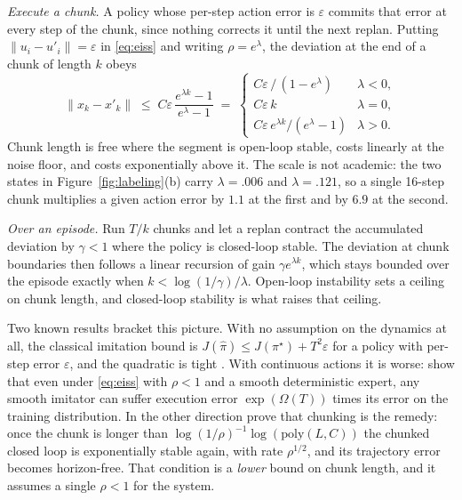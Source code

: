 \emph{Execute a chunk.} A policy whose per-step action error is $\varepsilon$
commits that error at every step of the chunk, since nothing corrects it until
the next replan. Putting $\lVert u_i - u'_i \rVert = \varepsilon$ in
\eqref{eq:eiss} and writing $\rho = e^{\lambda}$, the deviation at the end of a
chunk of length $k$ obeys
\begin{equation}
\lVert x_k - x'_k \rVert \;\le\; C\varepsilon\,
\frac{e^{\lambda k}-1}{e^{\lambda}-1}
\;=\;
\begin{cases}
C\varepsilon\,/\,(1-e^{\lambda}) & \lambda < 0,\\[2pt]
C\varepsilon\,k & \lambda = 0,\\[2pt]
C\varepsilon\,e^{\lambda k}/(e^{\lambda}-1) & \lambda > 0.
\end{cases}
\label{eq:chunk}
\end{equation}
Chunk length is free where the segment is open-loop stable, costs linearly at
the noise floor, and costs exponentially above it. The scale is not academic:
the two states in Figure~\ref{fig:labeling}(b) carry $\lambda{=}.006$ and
$\lambda{=}.121$, so a single 16-step chunk multiplies a given action error by
$1.1$ at the first and by $6.9$ at the second.

\emph{Over an episode.} Run $T/k$ chunks and let a replan contract the
accumulated deviation by $\gamma<1$ where the policy is closed-loop stable. The
deviation at chunk boundaries then follows a linear recursion of gain
$\gamma e^{\lambda k}$, which stays bounded over the episode exactly when
$k < \log(1/\gamma)/\lambda$. Open-loop instability sets a ceiling on chunk
length, and closed-loop stability is what raises that ceiling.

Two known results bracket this picture. With no assumption on the dynamics at
all, the classical imitation bound is
$J(\hat\pi) \le J(\pi^\star) + T^2\varepsilon$ for a policy with per-step error
$\varepsilon$, and the quadratic is tight \citep{ross2010efficient}. With
continuous actions it is worse:
\citet{simchowitz2025pitfalls} show that even under \eqref{eq:eiss} with
$\rho<1$ and a smooth deterministic expert, any smooth imitator can suffer
execution error $\exp(\Omega(T))$ times its error on the training distribution.
In the other direction \citet{zhang2025chunking} prove that chunking is the
remedy: once the chunk is longer than
$\log(1/\rho)^{-1}\log(\mathrm{poly}(L,C))$ the chunked closed loop is
exponentially stable again, with rate $\rho^{1/2}$, and its trajectory error
becomes horizon-free. That condition is a \emph{lower} bound on chunk length,
and it assumes a single $\rho<1$ for the system.

